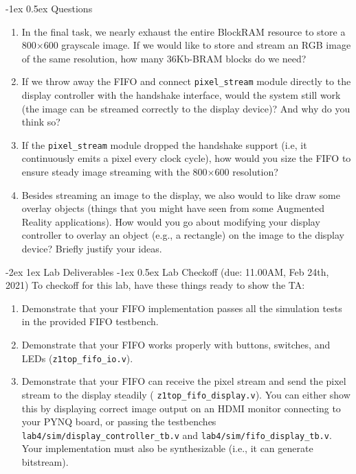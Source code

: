 \documentclass[11pt]{article}
\makeatletter
\renewcommand{\section}
{\@startsection {section}{1}{0pt}
 {-2ex}
 {1ex}
 {\bfseries\Large}}
\renewcommand{\subsection}
{\@startsection {subsection}{1}{0pt}
 {-1ex}
 {0.5ex}
 {\bfseries\normalsize}}
\makeatother
\begin{document}
\subsection{Questions}\label{sec:Q2}
\begin{enumerate}
\item In the final task, we nearly exhaust the entire BlockRAM resource to store a 800$\times$600 grayscale image. If we would like to store and stream an RGB image of the same resolution, how many 36Kb-BRAM blocks do we need?
\item If we throw away the FIFO and connect \verb|pixel_stream| module directly to the display controller with the handshake interface, would the system still work (the image can be streamed correctly to the display device)? And why do you think so?
\item If the \verb|pixel_stream| module dropped the handshake support (i.e, it continuously emits a pixel every clock cycle), how would you size the FIFO to ensure steady image streaming with the 800$\times$600 resolution?
\item Besides streaming an image to the display, we also would to like draw some overlay objects (things that you might have seen from some Augmented Reality applications). How would you go about modifying your display controller to overlay an object (e.g., a rectangle) on the image to the display device? Briefly justify your ideas.
\end{enumerate}

\section{Lab Deliverables}
\subsection{Lab Checkoff (due: 11.00AM, Feb 24th, 2021)}
To checkoff for this lab, have these things ready to show the TA:
\begin{enumerate}
  \item Demonstrate that your FIFO implementation passes all the simulation tests in the provided FIFO testbench.
  \item Demonstrate that your FIFO works properly with buttons, switches, and LEDs (\verb|z1top_fifo_io.v|).
  \item Demonstrate that your FIFO can receive the pixel stream and send the pixel stream to the display steadily ( \verb|z1top_fifo_display.v|). You can either show this by displaying correct image output on an HDMI monitor connecting to your PYNQ board, or passing the testbenches \verb|lab4/sim/display_controller_tb.v| and \verb|lab4/sim/fifo_display_tb.v|. Your implementation must also be synthesizable (i.e., it can generate bitstream).
\end{enumerate}
\end{document}
